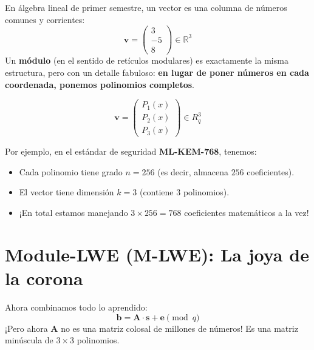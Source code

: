 En álgebra lineal de primer semestre, un vector es una columna de números comunes y corrientes:
\[
\mathbf{v} = \begin{pmatrix} 3 \\ -5 \\ 8 \end{pmatrix} \in \mathbb{R}^3
\]
Un \textbf{módulo} (en el sentido de retículos modulares) es exactamente la misma estructura, pero con un detalle fabuloso: \textbf{en lugar de poner números en cada coordenada, ponemos polinomios completos}.

\[
\mathbf{v} = \begin{pmatrix} P_1(x) \\ P_2(x) \\ P_3(x) \end{pmatrix} \in R_q^3
\]

Por ejemplo, en el estándar de seguridad \textbf{ML-KEM-768}, tenemos:
\begin{itemize}
  \item Cada polinomio tiene grado $n = 256$ (es decir, almacena $256$ coeficientes).
  \item El vector tiene dimensión $k = 3$ (contiene $3$ polinomios).
  \item ¡En total estamos manejando $3 \times 256 = 768$ coeficientes matemáticos a la vez!
\end{itemize}

\section{Module-LWE (M-LWE): La joya de la corona}

Ahora combinamos todo lo aprendido:
\begin{equation}
\mathbf{b} = \mathbf{A} \cdot \mathbf{s} + \mathbf{e} \pmod q
\end{equation}
¡Pero ahora $\mathbf{A}$ no es una matriz colosal de millones de números! Es una matriz minúscula de $3 \times 3$ polinomios.

